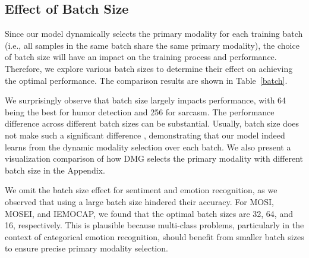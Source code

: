\documentclass[11pt,a4paper]{article}
\begin{document}
\subsection{Effect of Batch Size}
Since our model dynamically selects the primary modality for each training batch (i.e., all samples in the same batch share the same primary modality), the choice of batch size will have an impact on the training process and performance. Therefore, we explore various batch sizes to determine their effect on achieving the optimal performance. The comparison results are shown in Table~\ref{batch}.

\begin{table}[!ht]
\centering
\caption{Comparison results on UR-FUNNY and MUStARD using different batch sizes.}
\label{batch}
\end{table}

We surprisingly observe that batch size largely impacts performance, with 64 being the best for humor detection and 256 for sarcasm. The performance difference across different batch sizes can be substantial. Usually, batch size does not make such a significant difference \cite{smith2017don,lian2022smin}, demonstrating that our model indeed learns from the dynamic modality selection over each batch. We also present a visualization comparison of how DMG selects the primary modality with different batch size in the Appendix.

We omit the batch size effect for sentiment and emotion recognition, as we observed that using a large batch size hindered their accuracy. For MOSI, MOSEI, and IEMOCAP, we found that the optimal batch sizes are 32, 64, and 16, respectively. This is plausible because multi-class problems, particularly in the context of categorical emotion recognition, should benefit from smaller batch sizes to ensure precise primary modality selection.
\end{document}
